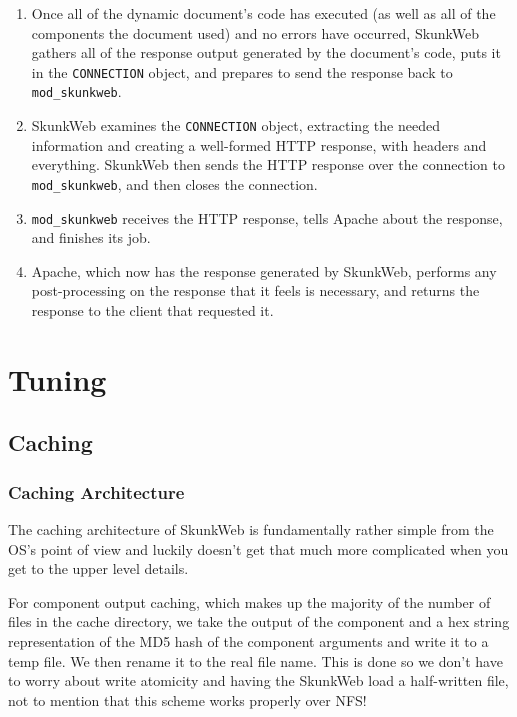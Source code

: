 \documentclass[titlepage]{manual}
\begin{document}
\begin{enumerate}
\item Once all of the dynamic document's code has executed (as well as
all of the components the document used) and no errors have occurred,
SkunkWeb gathers all of the response output generated by the
document's code, puts it in the \texttt{CONNECTION} object, and
prepares to send the response back to \texttt{mod\_skunkweb}.

\item SkunkWeb examines the \texttt{CONNECTION} object, extracting the
needed information and creating a well-formed HTTP response, with
headers and everything. SkunkWeb then sends the HTTP response over the
connection to \texttt{mod\_skunkweb}, and then closes the connection.

\item \texttt{mod\_skunkweb} receives the HTTP response, tells Apache
about the response, and finishes its job.

\item Apache, which now has the response generated by SkunkWeb,
performs any post-processing on the response that it feels is
necessary, and returns the response to the client that requested it.

\end{enumerate}

\chapter{Tuning}
\section{Caching}
\subsection{Caching Architecture}
The caching architecture of SkunkWeb is fundamentally rather simple
from the OS's point of view and luckily doesn't get that much more
complicated when you get to the upper level details.

For component output caching, which makes up the majority of the
number of files in the cache directory, we take the output of the
component and a hex string representation of the MD5 hash of the
component arguments and write it to a temp file. We then rename it
to the real file name. This is done so we don't have to worry about
write atomicity and having the SkunkWeb load a half-written file,
not to mention that this scheme works properly over NFS!
\end{document}
